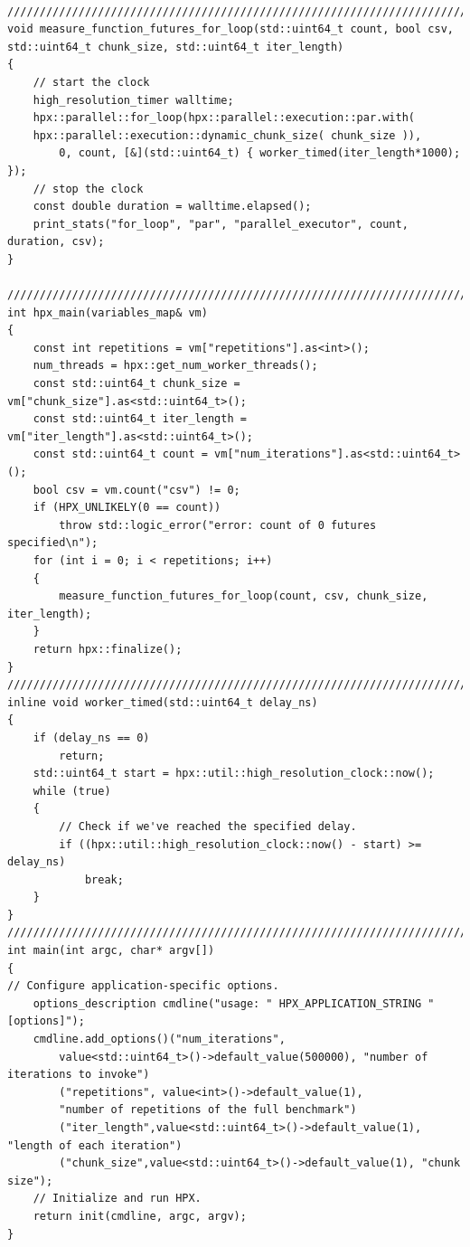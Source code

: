 \begin{lstlisting}[basicstyle=\fontsize{8}{9}\selectfont,float,floatplacement=H,caption= {A simple hpx for\textunderscore{loop} used to study the effect of grain size on the achieved parallelism.}, label={hpx_for_loop}]

///////////////////////////////////////////////////////////////////////////////
void measure_function_futures_for_loop(std::uint64_t count, bool csv, std::uint64_t chunk_size, std::uint64_t iter_length)
{
	// start the clock
	high_resolution_timer walltime;
	hpx::parallel::for_loop(hpx::parallel::execution::par.with(
	hpx::parallel::execution::dynamic_chunk_size( chunk_size )),
		0, count, [&](std::uint64_t) { worker_timed(iter_length*1000); });
	// stop the clock
	const double duration = walltime.elapsed();
	print_stats("for_loop", "par", "parallel_executor", count, duration, csv);
}

///////////////////////////////////////////////////////////////////////////////
int hpx_main(variables_map& vm)
{	
	const int repetitions = vm["repetitions"].as<int>();
	num_threads = hpx::get_num_worker_threads();
	const std::uint64_t chunk_size = vm["chunk_size"].as<std::uint64_t>();
	const std::uint64_t iter_length = vm["iter_length"].as<std::uint64_t>();
	const std::uint64_t count = vm["num_iterations"].as<std::uint64_t>();
	bool csv = vm.count("csv") != 0;
	if (HPX_UNLIKELY(0 == count))
		throw std::logic_error("error: count of 0 futures specified\n");
	for (int i = 0; i < repetitions; i++)
	{
		measure_function_futures_for_loop(count, csv, chunk_size, iter_length);
	}	
	return hpx::finalize();
}
///////////////////////////////////////////////////////////////////////////////
inline void worker_timed(std::uint64_t delay_ns)
{
	if (delay_ns == 0)
		return;
	std::uint64_t start = hpx::util::high_resolution_clock::now();
	while (true)
	{
		// Check if we've reached the specified delay.
		if ((hpx::util::high_resolution_clock::now() - start) >= delay_ns)
			break;
	}
}
///////////////////////////////////////////////////////////////////////////////
int main(int argc, char* argv[])
{
// Configure application-specific options.
	options_description cmdline("usage: " HPX_APPLICATION_STRING " [options]");
	cmdline.add_options()("num_iterations",
		value<std::uint64_t>()->default_value(500000), "number of iterations to invoke")
		("repetitions", value<int>()->default_value(1),
		"number of repetitions of the full benchmark")
		("iter_length",value<std::uint64_t>()->default_value(1), "length of each iteration")
		("chunk_size",value<std::uint64_t>()->default_value(1), "chunk size");
	// Initialize and run HPX.
	return init(cmdline, argc, argv);
}
\end{lstlisting}

